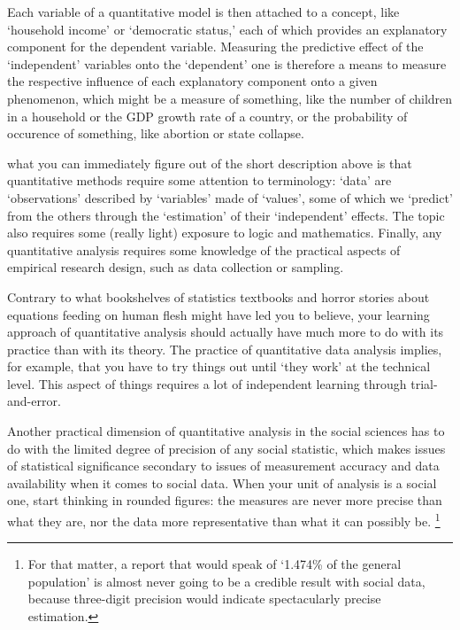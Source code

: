 	Each variable of a quantitative model is then attached to a concept, like `household income' or `democratic status,' each of which provides an explanatory component for the dependent variable. Measuring the predictive effect of the `independent' variables onto the `dependent' one is therefore a means to measure the respective influence of each explanatory component onto a given phenomenon, which might be a measure of something, like the number of children in a household or the GDP growth rate of a country, or the probability of occurence of something, like abortion or state collapse.%

	 what you can immediately figure out of the short description above is that quantitative methods require some attention to terminology: `data' are `observations' described by `variables' made of `values', some of which we `predict' from the others through the `estimation' of their `independent' effects. The topic also requires some (really light) exposure to logic and mathematics. Finally, any quantitative analysis requires some knowledge of the practical aspects of empirical research design, such as data collection or sampling.%

	Contrary to what bookshelves of statistics textbooks and horror stories about equations feeding on human flesh might have led you to believe, your learning approach of quantitative analysis should actually have much more to do with its practice than with its theory. The practice of quantitative data analysis implies, for example, that you have to try things out until `they work' at the technical level. This aspect of things requires a lot of independent learning through trial-and-error.%
	
	Another practical dimension of quantitative analysis in the social sciences has to do with the limited degree of precision of any social statistic, which makes issues of statistical significance secondary to issues of measurement accuracy and data availability when it comes to social data. When your unit of analysis is a social one, start thinking in rounded figures: the measures are never more precise than what they are, nor the data more representative than what it can possibly be.%
		\footnote{For that matter, a report that would speak of `1.474\% of the general population' is almost never going to be a credible result with social data, because three-digit precision would indicate spectacularly precise estimation.}%
		
%
